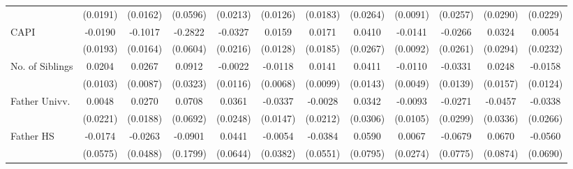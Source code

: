 \begin{table}[htbp]
\begin{tabular}{l*{11}{c}}
            &    (0.0191)         &    (0.0162)         &    (0.0596)         &    (0.0213)         &    (0.0126)         &    (0.0183)         &    (0.0264)         &    (0.0091)         &    (0.0257)         &    (0.0290)         &    (0.0229)         \\
\addlinespace
CAPI        &     -0.0190         &     -0.1017\sym{***}&     -0.2822\sym{***}&     -0.0327         &      0.0159         &      0.0171         &      0.0410         &     -0.0141         &     -0.0266         &      0.0324         &      0.0054         \\
            &    (0.0193)         &    (0.0164)         &    (0.0604)         &    (0.0216)         &    (0.0128)         &    (0.0185)         &    (0.0267)         &    (0.0092)         &    (0.0261)         &    (0.0294)         &    (0.0232)         \\
\addlinespace
No. of Siblings&      0.0204\sym{*}  &      0.0267\sym{**} &      0.0912\sym{**} &     -0.0022         &     -0.0118         &      0.0141         &      0.0411\sym{**} &     -0.0110\sym{*}  &     -0.0331\sym{*}  &      0.0248         &     -0.0158         \\
            &    (0.0103)         &    (0.0087)         &    (0.0323)         &    (0.0116)         &    (0.0068)         &    (0.0099)         &    (0.0143)         &    (0.0049)         &    (0.0139)         &    (0.0157)         &    (0.0124)         \\
\addlinespace
Father Univv.&      0.0048         &      0.0270         &      0.0708         &      0.0361         &     -0.0337\sym{*}  &     -0.0028         &      0.0342         &     -0.0093         &     -0.0271         &     -0.0457         &     -0.0338         \\
            &    (0.0221)         &    (0.0188)         &    (0.0692)         &    (0.0248)         &    (0.0147)         &    (0.0212)         &    (0.0306)         &    (0.0105)         &    (0.0299)         &    (0.0336)         &    (0.0266)         \\
\addlinespace
Father HS   &     -0.0174         &     -0.0263         &     -0.0901         &      0.0441         &     -0.0054         &     -0.0384         &      0.0590         &      0.0067         &     -0.0679         &      0.0670         &     -0.0560         \\
            &    (0.0575)         &    (0.0488)         &    (0.1799)         &    (0.0644)         &    (0.0382)         &    (0.0551)         &    (0.0795)         &    (0.0274)         &    (0.0775)         &    (0.0874)         &    (0.0690)         \\

\end{tabular}
\end{table}
